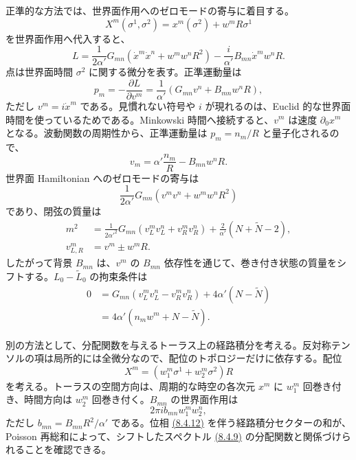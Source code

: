正準的な方法では、世界面作用へのゼロモードの寄与に着目する。
\begin{equation}
X^m(\sigma^1,\sigma^2)=x^m(\sigma^2)+w^mR\sigma^1
\tag{8.4.4}\label{eq:8.4.4}
\end{equation}
を世界面作用へ代入すると、
\begin{equation}
L=\frac1{2\alpha'}G_{mn}(\dot x^m\dot x^n+w^mw^nR^2)
-\frac i{\alpha'}B_{mn}\dot x^mw^nR.
\tag{8.4.5}\label{eq:8.4.5}
\end{equation}
点は世界面時間 $\sigma^2$ に関する微分を表す。正準運動量は
\begin{equation}
p_m=-\frac{\partial L}{\partial v^m}
=\frac1{\alpha'}(G_{mn}v^n+B_{mn}w^nR),
\tag{8.4.6}\label{eq:8.4.6}
\end{equation}
ただし $v^m=i\dot x^m$ である。見慣れない符号や $i$ が現れるのは、Euclid 的な世界面時間を使っているためである。Minkowski 時間へ接続すると、$v^m$ は速度 $\partial_0x^m$ となる。波動関数の周期性から、正準運動量は $p_m=n_m/R$ と量子化されるので、
\begin{equation}
v_m=\alpha'\frac{n_m}R-B_{mn}w^nR.
\tag{8.4.7}\label{eq:8.4.7}
\end{equation}
世界面 Hamiltonian へのゼロモードの寄与は
\begin{equation}
\frac1{2\alpha'}G_{mn}(v^mv^n+w^mw^nR^2)
\tag{8.4.8}\label{eq:8.4.8}
\end{equation}
であり、閉弦の質量は
\begin{align}
m^2&=\frac1{2\alpha'^2}G_{mn}(v_L^mv_L^n+v_R^mv_R^n)
+\frac2{\alpha'}(N+\widetilde N-2),
\tag{8.4.9a}\label{eq:8.4.9a}\\
v_{L,R}^m&=v^m\pm w^mR.
\tag{8.4.9b}\label{eq:8.4.9b}
\end{align}
したがって背景 $B_{mn}$ は、$v^m$ の $B_{mn}$ 依存性を通じて、巻き付き状態の質量をシフトする。$L_0-\widetilde L_0$ の拘束条件は
\begin{equation}
\begin{aligned}
0&=G_{mn}(v_L^mv_L^n-v_R^mv_R^n)+4\alpha'(N-\widetilde N)\\
&=4\alpha'(n_mw^m+N-\widetilde N).
\end{aligned}
\tag{8.4.10}\label{eq:8.4.10}
\end{equation}

別の方法として、分配関数を与えるトーラス上の経路積分を考える。反対称テンソルの項は局所的には全微分なので、配位のトポロジーだけに依存する。配位
\begin{equation}
X^m=(w_1^m\sigma^1+w_2^m\sigma^2)R
\tag{8.4.11}\label{eq:8.4.11}
\end{equation}
を考える。トーラスの空間方向は、周期的な時空の各次元 $x^m$ に $w_1^m$ 回巻き付き、時間方向は $w_2^m$ 回巻き付く。$B_{mn}$ の世界面作用は
\begin{equation}
2\pi ib_{mn}w_1^mw_2^n,
\tag{8.4.12}\label{eq:8.4.12}
\end{equation}
ただし $b_{mn}=B_{mn}R^2/\alpha'$ である。位相 \hyperref[eq:8.4.12]{(8.4.12)} を伴う経路積分セクターの和が、Poisson 再総和によって、シフトしたスペクトル \hyperref[eq:8.4.9a]{(8.4.9)} の分配関数と関係づけられることを確認できる。

